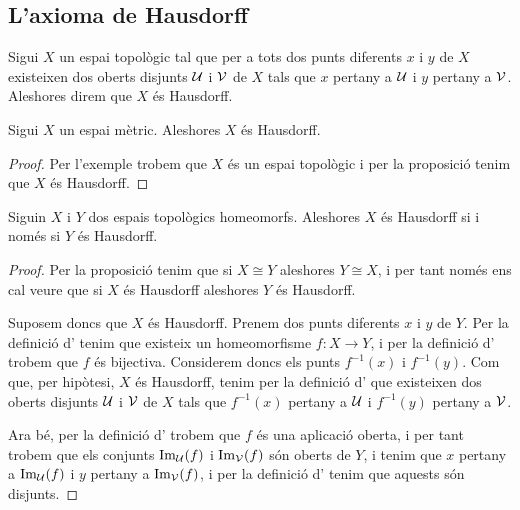 \documentclass[../../Main.tex]{subfiles}
\begin{document}
	\subsection{L'axioma de Hausdorff}
	\begin{definition}
		\label{def:espai Hausdorff}
		Sigui \(X\) un espai topològic tal que per a tots dos punts diferents \(x\) i \(y\) de \(X\) existeixen dos oberts disjunts \(\mathcal{U}\) i \(\mathcal{V}\) de \(X\) tals que \(x\) pertany a \(\mathcal{U}\) i \(y\) pertany a \(\mathcal{V}\). Aleshores direm que \(X\) és Hausdorff.
	\end{definition}
	\begin{proposition}
		\label{prop:els espais mètrics són Hausdorff}
		Sigui \(X\) un espai mètric. Aleshores \(X\) és Hausdorff.
		\begin{proof}
			Per l'exemple  trobem que \(X\) és un espai topològic i per la proposició  tenim que \(X\) és Hausdorff.
		\end{proof}
	\end{proposition}
	\begin{proposition}
		\label{prop:ser Hausdorff és una propietat topològica}
		Siguin \(X\) i \(Y\) dos espais topològics homeomorfs. Aleshores \(X\) és Hausdorff si i només si \(Y\) és Hausdorff.
		\begin{proof}
			Per la proposició  tenim que si \(X\cong Y\) aleshores \(Y\cong X\), i per tant només ens cal veure que si \(X\) és Hausdorff aleshores \(Y\) és Hausdorff.
			
			Suposem doncs que \(X\) és Hausdorff. Prenem dos punts diferents \(x\) i \(y\) de \(Y\). Per la definició d' tenim que existeix un homeomorfisme \(f\colon X\longrightarrow Y\), i per la definició d' trobem que \(f\) és bijectiva. Considerem doncs els punts \(f^{-1}(x)\) i \(f^{-1}(y)\). Com que, per hipòtesi, \(X\) és Hausdorff, tenim per la definició d' que existeixen dos oberts disjunts \(\mathcal{U}\) i \(\mathcal{V}\) de \(X\) tals que \(f^{-1}(x)\) pertany a \(\mathcal{U}\) i \(f^{-1}(y)\) pertany a \(\mathcal{V}\).
			
			Ara bé, per la definició d' trobem que \(f\) és una aplicació oberta, i per tant trobem que els conjunts \(\operatorname{Im}_{\mathcal{U}}(f)\) i \(\operatorname{Im}_{\mathcal{V}}(f)\) són oberts de \(Y\), i tenim que \(x\) pertany a \(\operatorname{Im}_{\mathcal{U}}(f)\) i \(y\) pertany a \(\operatorname{Im}_{\mathcal{V}}(f)\), i per la definició d' tenim que aquests són disjunts.
		\end{proof}
	\end{proposition}
\end{document}

